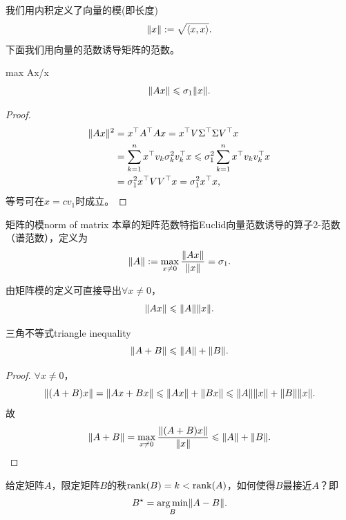 我们用内积定义了向量的模(即长度)
\[
	\lVert x\rVert := \sqrt{\langle x,x\rangle}.
\]
下面我们用向量的范数诱导矩阵的范数。
\begin{theorem}{}{max Ax/x}
	\begin{equation}
		\lVert Ax\rVert \leqslant \sigma_1\lVert x\rVert.
	\end{equation}
\end{theorem}
\begin{proof}
	
	\begin{align*}
		\lVert Ax\rVert^2 &= x^\top A^\top Ax = x^\top V\Sigma^\top\Sigma V^\top x\\
		&= \sum_{k=1}^nx^\top v_k\sigma_k^2v_k^\top x \leqslant \sigma_1^2\sum_{k=1}^nx^\top v_kv_k^\top x\\
		&= \sigma_1^2x^\top VV^\top x = \sigma_1^2x^\top x,
	\end{align*}
	等号可在$x = cv_1$时成立。
\end{proof}
\begin{definition}{矩阵的模}{norm of matrix}
	本章的矩阵范数特指Euclid向量范数诱导的算子2-范数（谱范数），定义为
	\begin{equation}
		\lVert A\rVert := \max_{x\neq 0}\frac{\lVert Ax\rVert}{\lVert x\rVert} = \sigma_1.
	\end{equation}
\end{definition}
\begin{corollary}
	由矩阵模的定义可直接导出$\forall x \neq 0$，
	\[
		\lVert Ax\rVert \leqslant \lVert A\rVert\lVert x\rVert.
	\]
\end{corollary}
\begin{theorem}{三角不等式}{triangle inequality}
	\begin{equation}
		\lVert A + B\rVert \leqslant \lVert A\rVert + \lVert B\rVert.
	\end{equation}
\end{theorem}
\begin{proof}
	$\forall x \neq 0$，
	\[
		\lVert(A + B)x\rVert = \lVert Ax + Bx\rVert \leqslant \lVert Ax\rVert + \lVert Bx\rVert \leqslant \lVert A\rVert\lVert x\rVert + \lVert B\rVert\lVert x\rVert.
	\]
	故
	\[
		\lVert A + B\rVert = \max_{x\neq0}\frac{\lVert(A + B)x\rVert}{\lVert x\rVert} \leqslant \lVert A\rVert + \lVert B\rVert.
	\]
\end{proof}

给定矩阵$A$，限定矩阵$B$的秩$\operatorname{rank}(B) = k < \operatorname{rank}(A)$，如何使得$B$最接近$A$？即
\[
	B^\star = \operatorname*{arg\,min}_B\lVert A - B\rVert.
\]

